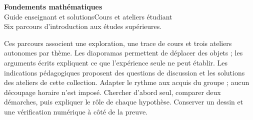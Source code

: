\begin{center}
{\Large\bfseries\textcolor{marine}{Fondements mathématiques}}\\[4pt]
{\large\ifprof Guide enseignant et solutions\else Cours et ateliers étudiant\fi}\\[4pt]
{\small Six parcours d'introduction aux études supérieures.}
\end{center}
Ces parcours associent une exploration, une trace de cours et trois ateliers autonomes par thème. Les diaporamas permettent de déplacer des objets ; les arguments écrits expliquent ce que l'expérience seule ne peut établir.
\ifprof
Les indications pédagogiques proposent des questions de discussion et les solutions des ateliers de cette collection. Adapter le rythme aux acquis du groupe ; aucun découpage horaire n'est imposé.
\else
Chercher d'abord seul, comparer deux démarches, puis expliquer le rôle de chaque hypothèse. Conserver un dessin et une vérification numérique à côté de la preuve.
\fi
\begingroup\small\setlength{\parskip}{0pt}\tableofcontents\endgroup
\clearpage
